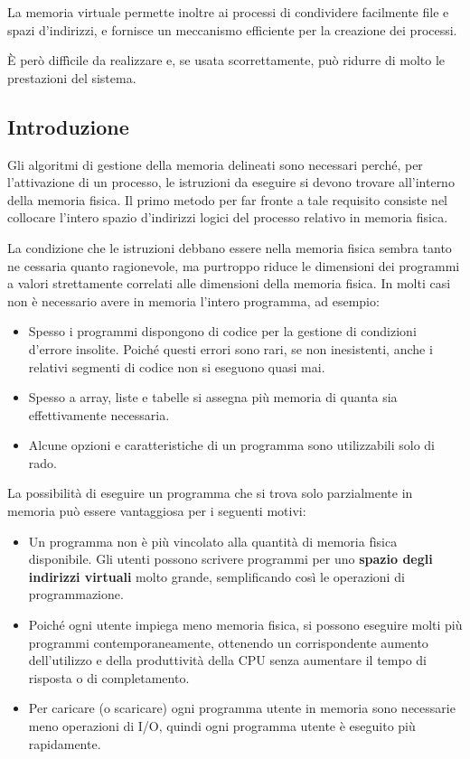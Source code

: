 \documentclass[11pt,a4paper]{article}
\begin{document}
La
memoria virtuale permette inoltre ai processi di condividere facilmente file e spazi d'indirizzi, e fornisce un meccanismo efficiente per la creazione dei processi.

È però diffìcile da realizzare e, se usata scorrettamente, può ridurre di molto le prestazioni del
sistema.

\subsection{Introduzione}
Gli algoritmi di gestione della memoria delineati sono necessari perché, per
l'attivazione di un processo, le istruzioni da eseguire si devono trovare all'interno della me­moria fisica. Il primo metodo per far fronte a tale requisito consiste nel collocare l'intero
spazio d'indirizzi logici del processo relativo in memoria fisica.

La condizione che le istruzioni debbano essere nella memoria fisica sembra tanto ne­
cessaria quanto ragionevole, ma purtroppo riduce le dimensioni dei programmi a valori
strettamente correlati alle dimensioni della memoria fisica. In molti casi non è necessario avere in memoria l'intero programma, ad esempio:
\begin{itemize}
  \item Spesso i programmi dispongono di codice per la gestione di condizioni d'errore insoli­te. Poiché questi errori sono rari, se non inesistenti, anche i relativi segmenti di codice non si eseguono quasi mai.
  \item Spesso a array, liste e tabelle si assegna più memoria di quanta sia effettivamente ne­cessaria.
  \item Alcune opzioni e caratteristiche di un programma sono utilizzabili solo di rado.
\end{itemize}
La possibilità di eseguire un programma che si trova solo parzialmente in memoria
può essere vantaggiosa per i seguenti motivi:
\begin{itemize}
  \item Un programma non è più vincolato alla quantità di memoria fìsica disponibile. Gli utenti possono scrivere programmi per uno \textbf{spazio degli indirizzi virtuali} molto gran­de, semplificando così le operazioni di programmazione.
  \item Poiché ogni utente impiega meno memoria fisica, si possono eseguire molti più pro­grammi contemporaneamente, ottenendo un corrispondente aumento dell'utilizzo e della produttività della CPU senza aumentare il tempo di risposta o di completamento.
  \item Per caricare (o scaricare) ogni programma utente in memoria sono necessarie meno operazioni di I/O, quindi ogni programma utente è eseguito più rapidamente.
\end{itemize}
\end{document}
